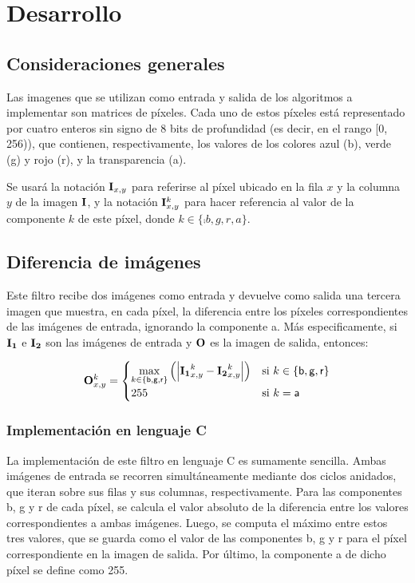 \section{Desarrollo}

  \subsection{Consideraciones generales}
    Las imagenes que se utilizan como entrada y salida de los algoritmos a implementar son matrices de píxeles. Cada uno de estos píxeles está representado por cuatro enteros sin signo de 8 bits de profundidad (es decir, en el rango [0, 256)), que contienen, respectivamente, los valores de los colores azul (\textsf{b}), verde (\textsf{g}) y rojo (\textsf{r}), y la transparencia (\textsf{a}).

    Se usará la notación $\mathbf{I}_{x,y}$ para referirse al píxel ubicado en la fila $x$ y la columna $y$ de la imagen $\mathbf{I}$, y la notación $\mathbf{I}_{x,y}^k$ para hacer referencia al valor de la componente $k$ de este píxel, donde $k \in \lbrace \comp{b, g, r, a} \rbrace$.
  
  \subsection{Diferencia de imágenes}
    Este filtro recibe dos imágenes como entrada y devuelve como salida una tercera imagen que muestra, en cada píxel, la diferencia entre los píxeles correspondientes de las imágenes de entrada, ignorando la componente \textsf{a}. Más especificamente, si $\mathbf{I_1}$ e $\mathbf{I_2}$ son las imágenes de entrada y $\mathbf{O}$ es la imagen de salida, entonces:

    \[ \mathbf{O}_{x,y}^k = \begin{cases}
      \displaystyle \max_{k \in \lbrace \mathsf{b, g, r} \rbrace} \left( \left\vert {\ensuremath{\mathbf{I_1}}}_{x,y}^k - {\mathbf{I_2}}_{x,y}^k \right\vert \right)
        & \text{si } k \in \lbrace \mathsf{b, g, r} \rbrace \\
      255
        & \text{si } k = \mathsf{a}
    \end{cases} \]

    \subsubsection{Implementación en lenguaje C}
      La implementación de este filtro en lenguaje C es sumamente sencilla. Ambas imágenes de entrada se recorren simultáneamente mediante dos ciclos anidados, que iteran sobre sus filas y sus columnas, respectivamente. Para las componentes \textsf{b}, \textsf{g} y \textsf{r} de cada píxel, se calcula el valor absoluto de la diferencia entre los valores correspondientes a ambas imágenes. Luego, se computa el máximo entre estos tres valores, que se guarda como el valor de las componentes \textsf{b}, \textsf{g} y \textsf{r} para el píxel correspondiente en la imagen de salida. Por último, la componente \textsf{a} de dicho píxel se define como 255.

